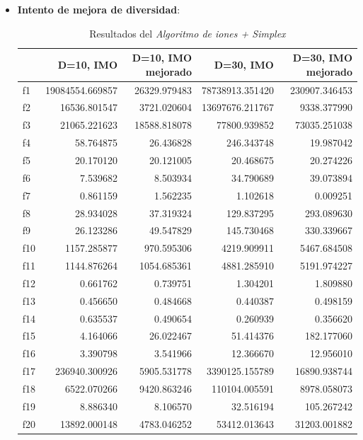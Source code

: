 \documentclass[a4paper,11pt]{article}
\begin{document}
\begin{itemize}
\begin{itemize}
 \end{itemize}
 
 \item \textbf{Intento de mejora de diversidad}:
 
 \begin{table}[H]	
  \caption{Resultados del \textit{Algoritmo de iones + Simplex}}
  \centering
  \begin{tabular}{|l|r|r|||r|r|}
  \hline
  & \textbf{D=10, IMO} & \textbf{D=10, IMO mejorado} & \textbf{D=30, IMO} & \textbf{D=30, IMO mejorado}\\ \hline
  f1 &  19084554.669857 &  26329.979483 &  78738913.351420 &  230907.346453 \\ \hline
  f2 &  16536.801547 &  3721.020604 &  13697676.211767 &  9338.377990 \\ \hline
  f3 &  21065.221623 &  18588.818078 &  77800.939852 &  73035.251038 \\ \hline
  f4 &  58.764875 &  26.436828 &  246.343748 &  19.987042 \\ \hline
  f5 &  20.170120 &  20.121005 &  20.468675 &  20.274226 \\ \hline
  f6 &  7.539682 &  8.503934 &  34.790689 &  39.073894 \\ \hline
  f7 &  0.861159 &  1.562235 &  1.102618 &  0.009251 \\ \hline
  f8 &  28.934028 &  37.319324 &  129.837295 &  293.089630 \\ \hline
  f9 &  26.123286 &  49.547829 &  145.730468 &  330.339667 \\ \hline
  f10 &  1157.285877 &  970.595306 &  4219.909911 &  5467.684508 \\ \hline
  f11 &  1144.876264 &  1054.685361 &  4881.285910 &  5191.974227 \\ \hline
  f12 &  0.661762 &  0.739751 &  1.304201 &  1.809880 \\ \hline
  f13 &  0.456650 &  0.484668 &  0.440387 &  0.498159 \\ \hline
  f14 &  0.635537 &  0.490654 &  0.260939 &  0.356620 \\ \hline
  f15 &  4.164066 &  26.022467 &  51.414376 &  182.177060 \\ \hline
  f16 &  3.390798 &  3.541966 &  12.366670 &  12.956010 \\ \hline
  f17 &  236940.300926 &  5905.531778 &  3390125.155789 &  16890.938744 \\ \hline
  f18 &  6522.070266 &  9420.863246 &  110104.005591 &  8978.058073 \\ \hline
  f19 &  8.886340 &  8.106570 &  32.516194 &  105.267242 \\ \hline
  f20 &  13892.000148 &  4783.046252 &  53412.013643 &  31203.001882 \\ \hline
  \end{tabular}
  \end{table}
 
\end{itemize}
\end{document}
